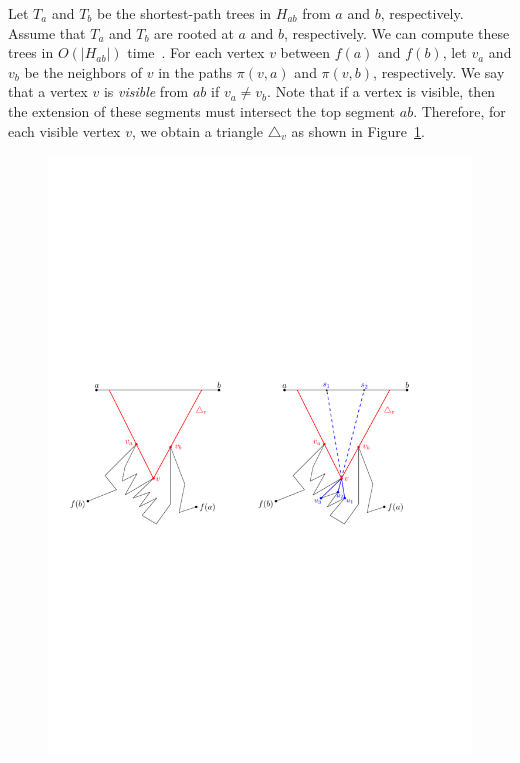 \documentclass[a4paper,UKenglish]{lipics}
\newcommand{\ff}[1]{\ensuremath{f(#1)}}
\newcommand{\p}[2]{\ensuremath{\pi(#1, #2)}}
\begin{document}
Let $T_a$ and $T_b$ be the shortest-path trees in $H_{ab}$ from $a$ and $b$, respectively. Assume that $T_a$ and $T_b$ are rooted at $a$ and $b$, respectively.
We can compute these trees in $O(|H_{ab}|)$ time~\cite{guibasShortestPathTree}. 
For each vertex $v$ between $\ff{a}$ and $\ff{b}$, let $v_a$ and $v_b$ be the neighbors of $v$ in the paths $\p{v}{a}$ and $\p{v}{ b}$, respectively.
We say that a vertex $v$ is \emph{visible} from $ab$ if $v_a\neq v_b$.
Note that if a vertex is visible, then the extension of these segments must intersect the top segment $ab$. 
Therefore, for each visible vertex $v$, we obtain a triangle $\triangle_v$ as shown in Figure~\ref{fig:Hourglass Cover}.

\begin{figure}[tb]
\centering
\includegraphics[width=1\textwidth]{img/HourglassCover.pdf}
\caption{\small }
\label{fig:Hourglass Cover}
\end{figure}
\end{document}
